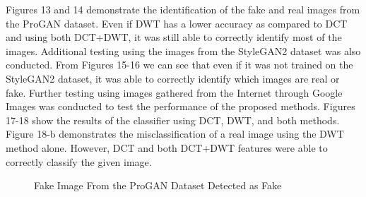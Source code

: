 \documentclass[journal]{./IEEE/IEEEtran}
\begin{document}
Figures 13 and 14 demonstrate the identification of the fake and real images from the ProGAN dataset. Even if DWT has a lower accuracy as compared to DCT and using both DCT+DWT, it was still able to correctly identify most of the images. Additional testing using the images from the StyleGAN2 dataset was also conducted. From Figures 15-16 we can see that even if it was not trained on the StyleGAN2 dataset, it was able to correctly identify which images are real or fake. Further testing using images gathered from the Internet through Google Images was conducted to test the performance of the proposed methods. Figures 17-18 show the results of the classifier using DCT, DWT, and both methods. Figure 18-b demonstrates the misclassification of a real image using the DWT method alone. However, DCT and both DCT+DWT features were able to correctly classify the given image.

\begin{figure}
    \centering
    \hfil
    \hfil
    \caption{Fake Image From the ProGAN Dataset Detected as Fake}
    \label{fig:mainfig}
\end{figure}
\end{document}
